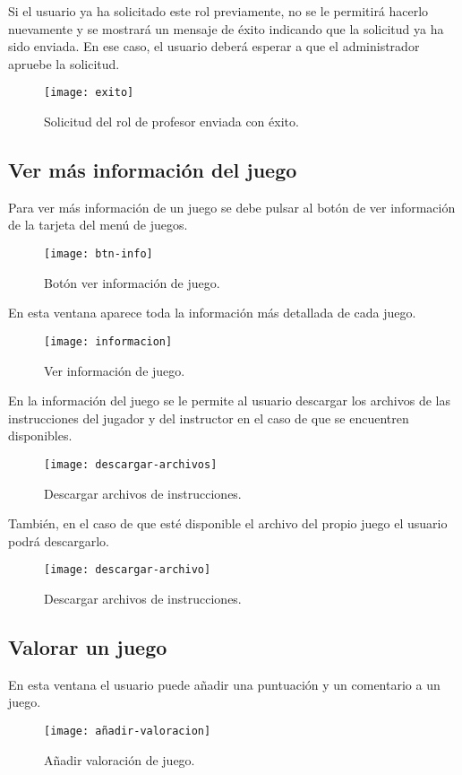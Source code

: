 Si el usuario ya ha solicitado este rol previamente, no se le permitirá hacerlo nuevamente y se mostrará un mensaje de éxito indicando que la solicitud ya ha sido enviada. En ese caso, el usuario deberá esperar a que el administrador apruebe la solicitud.
\begin{figure}[htb]
\centering
\texttt{[image: exito]}
\caption{Solicitud del rol de profesor enviada con éxito.}
\label{fig:exito}
\end{figure}

\subsection{Ver más información del juego}
Para ver más información de un juego se debe pulsar al botón de ver información de la tarjeta del menú de juegos.
\begin{figure}[htb]
\centering
\texttt{[image: btn-info]}
\caption{Botón ver información de juego.}
\label{fig:btn-info}
\end{figure}

En esta ventana aparece toda la información más detallada de cada juego.
\newpage
\begin{figure}[htb]
\centering
\texttt{[image: informacion]}
\caption{Ver información de juego.}
\label{fig:informacion}
\end{figure}

En la información del juego se le permite al usuario descargar los archivos de las instrucciones del jugador y del instructor en el caso de que se encuentren disponibles.
\begin{figure}[htb]
\centering
\texttt{[image: descargar-archivos]}
\caption{Descargar archivos de instrucciones.}
\label{fig:descargar-archivos}
\end{figure}

También, en el caso de que esté disponible el archivo del propio juego el usuario podrá descargarlo.
\begin{figure}[htb]
\centering
\texttt{[image: descargar-archivo]}
\caption{Descargar archivos de instrucciones.}
\label{fig:descargar-archivo}
\end{figure}

\subsection{Valorar un juego}
En esta ventana el usuario puede añadir una puntuación y un comentario a un juego.
\begin{figure}[htb]
\centering
\texttt{[image: añadir-valoracion]}
\caption{Añadir valoración de juego.}
\label{fig:añadir-valoracion}
\end{figure}

